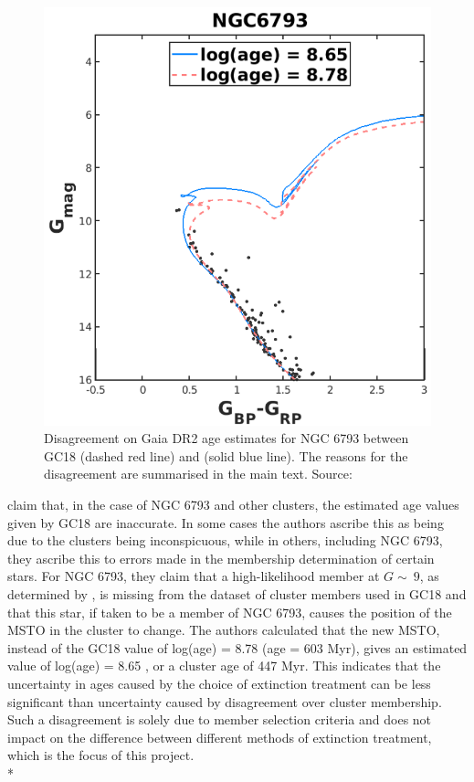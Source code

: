 \documentclass[12pt, a4paper]{report}
\begin{document}
\begin{figure}[h!]
\begin{center}
\includegraphics[width=1.0\textwidth]{bossini_ngc6793_different_age_estimate.png}
\caption{Disagreement on Gaia DR2 age estimates for NGC 6793 between GC18 (dashed red line) and \cite{2019A&A...623A.108B} (solid blue line). The reasons for the disagreement are summarised in the main text. Source:\cite{2019A&A...623A.108B}}
\label{bossini_age_cmd}
\end{center}
\end{figure}

\cite{2019A&A...623A.108B} claim that, in the case of NGC 6793 and other clusters, the estimated age values given by GC18 are inaccurate. In some cases the authors ascribe this as being due to the clusters being inconspicuous, while in others, including NGC 6793, they ascribe this to errors made in the membership determination of certain stars. For NGC 6793, they claim that a high-likelihood member at $G \sim\ 9$, as determined by \cite{2018A&A...618A..93C}, is missing from the dataset of cluster members used in GC18 and that this star, if taken to be a member of NGC 6793, causes the position of the MSTO in the cluster to change. The authors calculated that the new MSTO, instead of the GC18 value of log(age) = 8.78 (age = 603 Myr), gives an estimated value of log(age) = 8.65 , or a cluster age of 447 Myr. This indicates that the uncertainty in ages caused by the choice of extinction treatment can be less significant than uncertainty caused by disagreement over cluster membership. Such a disagreement is solely due to member selection criteria and does not impact on the difference between different methods of extinction treatment, which is the focus of this project. \\*
\end{document}
